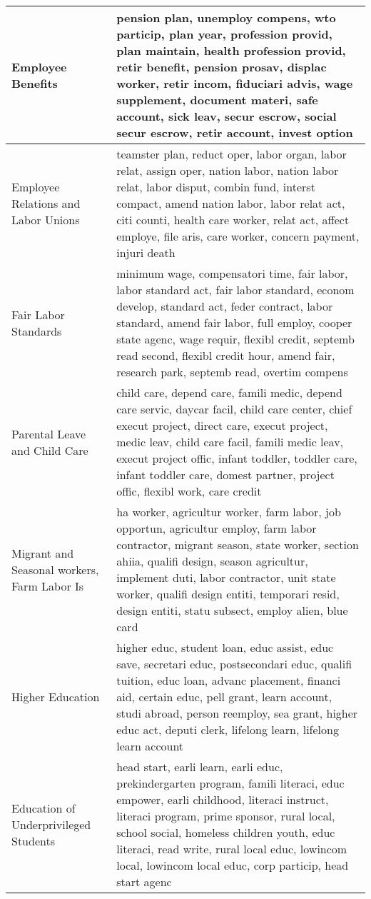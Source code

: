 \begin{longtable}{p{}p{}}
Employee Benefits & pension plan, unemploy compens, wto particip, plan year, profession provid, plan maintain, health profession provid, retir benefit, pension prosav, displac worker, retir incom, fiduciari advis, wage supplement, document materi, safe account, sick leav, secur escrow, social secur escrow, retir account, invest option \\ 
   \hline
Employee Relations and Labor Unions & teamster plan, reduct oper, labor organ, labor relat, assign oper, nation labor, nation labor relat, labor disput, combin fund, interst compact, amend nation labor, labor relat act, citi counti, health care worker, relat act, affect employe, file aris, care worker, concern payment, injuri death \\ 
   \hline
Fair Labor Standards & minimum wage, compensatori time, fair labor, labor standard act, fair labor standard, econom develop, standard act, feder contract, labor standard, amend fair labor, full employ, cooper state agenc, wage requir, flexibl credit, septemb read second, flexibl credit hour, amend fair, research park, septemb read, overtim compens \\ 
   \hline
Parental Leave and Child Care & child care, depend care, famili medic, depend care servic, daycar facil, child care center, chief execut project, direct care, execut project, medic leav, child care facil, famili medic leav, execut project offic, infant toddler, toddler care, infant toddler care, domest partner, project offic, flexibl work, care credit \\ 
   \hline
Migrant and Seasonal workers, Farm Labor Is & ha worker, agricultur worker, farm labor, job opportun, agricultur employ, farm labor contractor, migrant season, state worker, section ahiia, qualifi design, season agricultur, implement duti, labor contractor, unit state worker, qualifi design entiti, temporari resid, design entiti, statu subsect, employ alien, blue card \\ 
   \hline
Higher Education & higher educ, student loan, educ assist, educ save, secretari educ, postsecondari educ, qualifi tuition, educ loan, advanc placement, financi aid, certain educ, pell grant, learn account, studi abroad, person reemploy, sea grant, higher educ act, deputi clerk, lifelong learn, lifelong learn account \\ 
   \hline
Education of Underprivileged Students & head start, earli learn, earli educ, prekindergarten program, famili literaci, educ empower, earli childhood, literaci instruct, literaci program, prime sponsor, rural local, school social, homeless children youth, educ literaci, read write, rural local educ, lowincom local, lowincom local educ, corp particip, head start agenc \\ 

\end{longtable}
